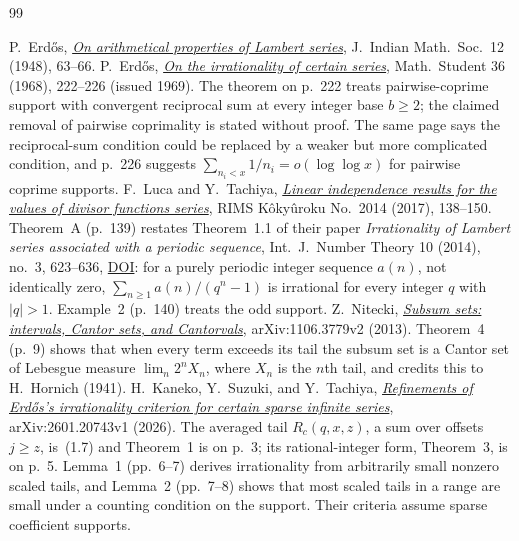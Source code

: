 \begin{thebibliography}{99}
\small
\raggedright
\setlength{\itemsep}{0pt}
 P.~Erd\H{o}s,
  \href{https://www.renyi.hu/~p_erdos/1948-04.pdf}{\emph{On arithmetical
  properties of Lambert series}}, J.~Indian Math.\ Soc.\ 12 (1948), 63--66.
 P.~Erd\H{o}s,
  \href{https://users.renyi.hu/~p_erdos/1969-09.pdf}{\emph{On the
  irrationality of certain series}}, Math.\ Student 36 (1968), 222--226
  (issued 1969).  The theorem on p.~222 treats pairwise-coprime support with
  convergent reciprocal sum at every integer base $b\ge2$; the claimed
  removal of pairwise coprimality is stated without proof.  The same page
  says the reciprocal-sum condition could be replaced by a weaker but more
  complicated condition, and p.~226 suggests
  $\sum_{n_i<x}1/n_i=o(\log\log x)$ for pairwise coprime supports.
 F.~Luca and Y.~Tachiya,
  \href{https://www.kurims.kyoto-u.ac.jp/~kyodo/kokyuroku/contents/pdf/2014-14.pdf}
  {\emph{Linear independence results for the values of divisor functions
  series}}, RIMS K\^oky\^uroku No.~2014 (2017), 138--150.  Theorem~A (p.~139)
  restates Theorem~1.1 of their paper \emph{Irrationality of Lambert series
  associated with a periodic sequence}, Int.\ J.~Number Theory 10 (2014),
  no.~3, 623--636,
  \href{https://doi.org/10.1142/S1793042113501121}{DOI}: for a purely periodic
  integer sequence $a(n)$, not identically zero,
  $\sum_{n\ge1}a(n)/(q^n-1)$ is irrational for every integer $q$ with $|q|>1$.
  Example~2 (p.~140) treats the odd support.
 Z.~Nitecki,
  \href{https://arxiv.org/abs/1106.3779v2}{\emph{Subsum sets: intervals, Cantor
  sets, and Cantorvals}}, arXiv:1106.3779v2 (2013).  Theorem~4 (p.~9) shows
  that when every term exceeds its tail the subsum set is a Cantor set of
  Lebesgue measure $\lim_n2^nX_n$, where $X_n$ is the $n$th tail, and credits
  this to H.~Hornich (1941).
 H.~Kaneko, Y.~Suzuki, and Y.~Tachiya,
  \href{https://arxiv.org/abs/2601.20743v1}{\emph{Refinements of Erd\H{o}s's
  irrationality criterion for certain sparse infinite series}},
  arXiv:2601.20743v1 (2026).  The averaged tail $R_c(q,x,z)$, a sum over
  offsets $j\ge z$, is~(1.7) and Theorem~1 is on p.~3; its rational-integer
  form, Theorem~3, is on p.~5.  Lemma~1 (pp.~6--7) derives irrationality from
  arbitrarily small nonzero scaled tails, and Lemma~2 (pp.~7--8) shows that
  most scaled tails in a range are small under a counting condition on the
  support.  Their criteria assume sparse coefficient supports.

\end{thebibliography}
